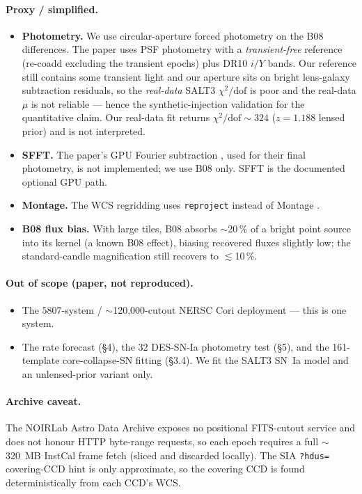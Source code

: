 \documentclass[11pt,letterpaper]{article}
\newcommand{\muamp}{\ensuremath{\mu}}
\begin{document}
\paragraph{Proxy / simplified.}
\begin{itemize}
\item \textbf{Photometry.} We use circular-aperture forced photometry on the
      B08 differences. The paper uses PSF photometry with a
      \emph{transient-free} reference (re-coadd excluding the transient
      epochs) plus DR10 $i/Y$ bands. Our reference still contains some
      transient light and our aperture sits on bright lens-galaxy
      subtraction residuals, so the \emph{real-data} SALT3
      $\chi^2/\mathrm{dof}$ is poor and the real-data $\muamp$ is not
      reliable --- hence the synthetic-injection validation for the
      quantitative claim. Our real-data fit returns $\chi^2/\mathrm{dof}\sim
      324$ ($z=1.188$ lensed prior) and is not interpreted.
\item \textbf{SFFT.} The paper's GPU Fourier subtraction
      \autocite{hu2022sfft}, used for their final photometry, is not
      implemented; we use B08 only. SFFT is the documented optional GPU
      path.
\item \textbf{Montage.} The WCS regridding uses \texttt{reproject}
      \autocite{robitaille2020reproject} instead of Montage
      \autocite{jacob2010montage}.
\item \textbf{B08 flux bias.} With large tiles, B08 absorbs $\sim$20\,\% of a
      bright point source into its kernel (a known B08 effect), biasing
      recovered fluxes slightly low; the standard-candle magnification still
      recovers to $\lesssim$10\,\%.
\end{itemize}

\paragraph{Out of scope (paper, not reproduced).}
\begin{itemize}
\item The $5807$-system / $\sim$120{,}000-cutout NERSC Cori deployment ---
      this is one system.
\item The rate forecast (\S4), the 32 DES-SN-Ia photometry test (\S5), and
      the 161-template core-collapse-SN fitting (\S3.4). We fit the SALT3
      SN~Ia model and an unlensed-prior variant only.
\end{itemize}

\paragraph{Archive caveat.} The NOIRLab Astro Data Archive exposes no
positional FITS-cutout service and does not honour HTTP byte-range requests,
so each epoch requires a full $\sim$320~MB InstCal frame fetch (sliced and
discarded locally). The SIA \texttt{?hdus=} covering-CCD hint is only
approximate, so the covering CCD is found deterministically from each CCD's
WCS.
\end{document}
